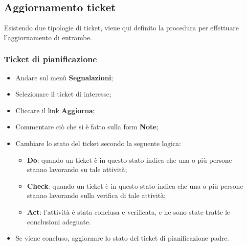 \documentclass[a4paper,12pt]{article}
\begin{document}
\subsection{Aggiornamento ticket}
{ 
Esistendo due tipologie di ticket, viene qui definito la procedura per effettuare l’aggiornamento di entrambe. 
\subsubsection{Ticket di pianificazione}
{
\begin{itemize}
\item Andare sul menù \textbf{Segnalazioni}; 
\item Selezionare il ticket di interesse; 
\item Cliccare il link \textbf{Aggiorna}; 
\item Commentare ciò che si è fatto sulla form \textbf{Note}; 
\item Cambiare lo stato del ticket secondo la seguente logica:
		\begin{itemize}
		\item \textbf{Do}: quando un ticket è in questo stato indica che una o più persone stanno 
		lavorando su tale attività; 
		\item \textbf{Check}: quando un ticket è in questo stato indica che una o più persone 
		stanno lavorando sulla verifica di tale attività; 
		\item \textbf{Act}: l’attività è stata conclusa e verificata, e ne sono state tratte le conclusioni adeguate. 
		
		\end{itemize} 

\item Se viene concluso, aggiornare lo stato del ticket di pianificazione padre. 

\end{itemize}
}

}
\end{document}
